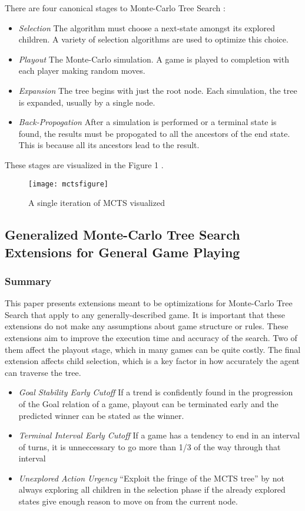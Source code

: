 \documentclass[letterpaper]{article}
\begin{document}
There are four canonical stages to Monte-Carlo Tree Search \cite{finnsson2012generalized}:
\begin{itemize}
\item \emph{Selection} The algorithm must choose a next-state amongst its explored children. A variety of selection algorithms are used to optimize this choice.
\item \emph{Playout} The Monte-Carlo simulation. A game is played to completion with each player making random moves.
\item \emph{Expansion} The tree begins with just the root node. Each simulation, the tree is expanded, usually by a single node.
\item \emph{Back-Propogation} After a simulation is performed or a terminal state is found, the results must be propogated to all the ancestors of the end state. This is because all its ancestors lead to the result.
\end{itemize}

These stages are visualized in the Figure 1 \cite{finnsson2012generalized}.

\begin{figure}[h]
\texttt{[image: mctsfigure]}
\centering
\caption{A single iteration of MCTS visualized}
\end{figure}

\subsection{Generalized Monte-Carlo Tree Search Extensions for General Game Playing}

\subsubsection{Summary}
This paper \cite{finnsson2012generalized} presents extensions meant to be optimizations for Monte-Carlo Tree Search that apply to any generally-described game. It is important that these extensions do not make any assumptions about game structure or rules. These extensions aim to improve the execution time and accuracy of the search. Two of them affect the playout stage, which in many games can be quite costly. The final extension affects child selection, which is a key factor in how accurately the agent can traverse the tree.
\begin{itemize}
\item \emph{Goal Stability Early Cutoff} If a trend is confidently found in the progression of the Goal relation of a game, playout can be terminated early and the predicted winner can be stated as the winner.
\item \emph{Terminal Interval Early Cutoff} If a game has a tendency to end in an interval of turns, it is unneccessary to go more than 1/3 of the way through that interval \cite{finnbjorn}
\item \emph{Unexplored Action Urgency} ``Exploit the fringe of the MCTS tree'' by not always exploring all children in the selection phase if the already explored states give enough reason to move on from the current node.
\end{itemize}
\end{document}
